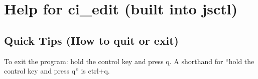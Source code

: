 \chapter{Help for ci\_edit (built into jsctl)}
\label{ci_help}
\section{Quick Tips (How to quit or exit)}
To exit the program: hold the control key and press q. A shorthand for ``hold the control key and press q'' is ctrl+q.